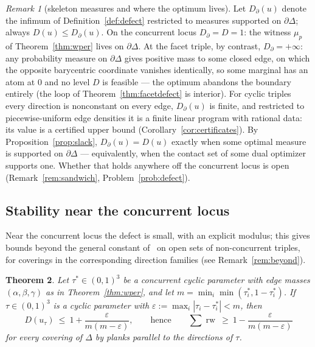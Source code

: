 \documentclass[11pt,reqno]{amsart}
\theoremstyle{plain}
\newtheorem{theorem}{Theorem}[section]
\theoremstyle{definition}
\theoremstyle{remark}
\newtheorem{remark}[theorem]{Remark}
\newcommand{\rw}{\operatorname{rw}}
\begin{document}
\begin{remark}[skeleton measures and where the optimum lives]
\label{rem:skeleton}
Let $D_\partial(u)$ denote the infimum of Definition~\ref{def:defect}
restricted to measures supported on $\partial\Delta$; always
$D(u)\le D_\partial(u)$. On the concurrent locus
$D_\partial=D=1$: the witness $\mu_p$ of Theorem~\ref{thm:wper} lives on
$\partial\Delta$. At the facet triple, by contrast, $D_\partial=+\infty$:
any probability measure on $\partial\Delta$ gives positive mass to some
closed edge, on which the opposite barycentric coordinate vanishes
identically, so some marginal has an atom at $0$ and no level $D$ is
feasible --- the optimum abandons the boundary entirely (the loop of
Theorem~\ref{thm:facetdefect} is interior). For cyclic triples every
direction is nonconstant on every edge, $D_\partial(u)$ is finite, and
restricted to piecewise-uniform edge densities it is a finite linear program
with rational data: its value is a certified upper bound
(Corollary~\ref{cor:certificates}). By Proposition~\ref{prop:slack},
$D_\partial(u)=D(u)$ exactly when some optimal measure is supported on
$\partial\Delta$ --- equivalently, when the contact set of some dual
optimizer supports one. Whether that holds anywhere off the concurrent locus
is open (Remark~\ref{rem:sandwich}, Problem~\ref{prob:defect}).
\end{remark}

\subsection*{Stability near the concurrent locus}
Near the concurrent locus the defect is small, with an explicit modulus; this
gives bounds beyond the general constant of~\cite{BY26} on open sets of
non-concurrent triples, for coverings in the corresponding direction families
(see Remark~\ref{rem:beyond}).

\begin{theorem}\label{thm:defectstab}
Let $\tau^*\in(0,1)^3$ be a concurrent cyclic parameter with edge masses
$(\alpha,\beta,\gamma)$ as in Theorem~\ref{thm:wper}, and let
$m=\min_i\min(\tau_i^*,1-\tau_i^*)$. If $\tau\in(0,1)^3$ is a cyclic parameter
with $\varepsilon:=\max_i|\tau_i-\tau_i^*|<m$, then
\[
D(u_\tau)\ \le\ 1+\frac{\varepsilon}{m(m-\varepsilon)},
\qquad\text{hence}\qquad
\sum\rw\ \ge\ 1-\frac{\varepsilon}{m(m-\varepsilon)}
\]
for every covering of $\Delta$ by planks parallel to the directions of $\tau$.
\end{theorem}
\end{document}
